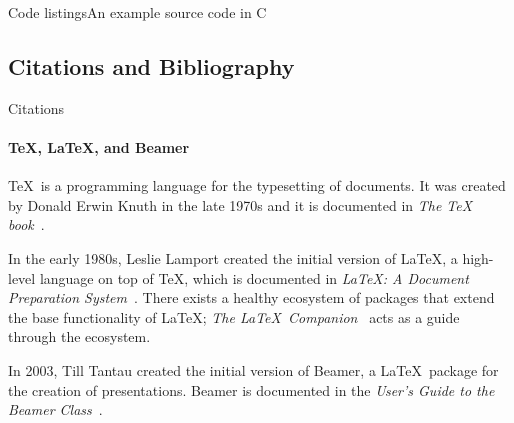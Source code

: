\documentclass{beamer}
\begin{document}
\begin{darkframes}
        \begin{frame}{Code listings}{An example source code in C}
          \sleepSort
        \end{frame}
    
        \subsection{Citations and Bibliography}
        \begin{frame}[label=citations]{Citations}
          \framesubtitle{\TeX, \LaTeX, and Beamer}
    
          \justifying\TeX\ is a programming language for the typesetting
          of documents. It was created by Donald Erwin Knuth in the late
          1970s and it is documented in \emph{The \TeX
          book}~\cite{knuth84}.
    
          In the early 1980s, Leslie Lamport created the initial version
          of \LaTeX, a high-level language on top of \TeX, which is
          documented in \emph{\LaTeX : A Document Preparation
          System}~\cite{lamport94}. There exists a healthy ecosystem of
          packages that extend the base functionality of \LaTeX;
          \emph{The \LaTeX\ Companion}~\cite{MG94} acts as a guide
          through the ecosystem.
    
          In 2003, Till Tantau created the initial version of Beamer, a
          \LaTeX\ package for the creation of presentations. Beamer is
          documented in the \emph{User's Guide to the Beamer
          Class}~\cite{tantau04}.
        \end{frame}
    

\end{darkframes}
\end{document}
